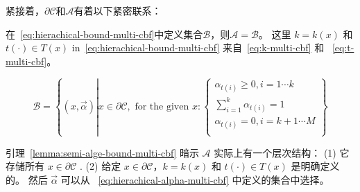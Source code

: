 紧接着，$\partial \mathcal{C}$和$\mathcal{A}$有着以下紧密联系：
\begin{lemma} \label{lemma:semi-alge-bound-multi-cbf}
    在~\eqref{eq:hierachical-bound-multi-cbf}中定义集合$\mathcal{B}$，则$\mathcal{A} = \mathcal{B}$。 这里 $k=k(x)$ 和 $t(\cdot) \in T(x)$ in~\eqref{eq:hierachical-bound-multi-cbf} 来自~\eqref{eq:k-multi-cbf} 和 ~\eqref{eq:t-multi-cbf}。
\end{lemma}

\begin{equation} \label{eq:hierachical-bound-multi-cbf}
\mathcal{B} =\left\{ \left( x,\overrightarrow{\alpha } \right) \left| x\in \partial \mathcal{C} , \text{ for the given }x:\begin{cases}
	\alpha _{t\left( i \right)}\ge 0,i=1\cdots k\\
	\sum_{i=1}^k{\alpha _{t\left( i \right)}}=1\\
	\alpha _{t\left( i \right)}=0,i=k+1\cdots M\\
\end{cases} \right. \right\} 
\end{equation}

\begin{remark}
    引理~\ref{lemma:semi-alge-bound-multi-cbf} 暗示 $\mathcal{A}$ 实际上有一个层次结构： (1) 它存储所有 $x \in \partial \mathcal{C}$ . (2) 给定 $x \in \partial \mathcal{C}$，$k=k(x)$ 和 $t(\cdot) \in T(x)$ 是明确定义的。 然后 $\overrightarrow{\alpha}$ 可以从 ~\eqref{eq:hierachical-alpha-multi-cbf} 中定义的集合中选择。
\end{remark}

